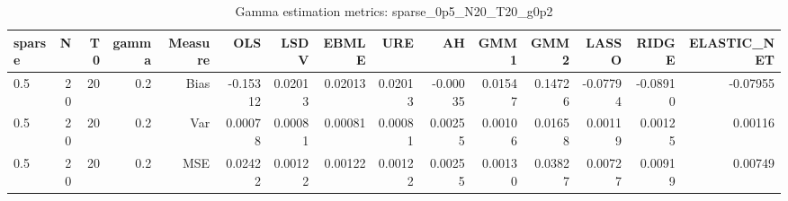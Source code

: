\begin{table}[!htbp]\centering
\caption{Gamma estimation metrics: sparse_0p5_N20_T20_g0p2}
\label{tab:table1_sparse_0p5_N20_T20_g0p2}
\begin{tabular}{lrrrrrrrrrrrrrr}
\hline
sparse & N & T0 & gamma & Measure & OLS & LSDV & EBMLE & URE & AH & GMM1 & GMM2 & LASSO & RIDGE & ELASTIC_NET \\
\hline
0.5 & 20 & 20 & 0.2 & Bias & -0.15312 & 0.02013 & 0.02013 & 0.02013 & -0.00035 & 0.01547 & 0.14726 & -0.07794 & -0.08910 & -0.07955 \\
0.5 & 20 & 20 & 0.2 & Var & 0.00078 & 0.00081 & 0.00081 & 0.00081 & 0.00255 & 0.00106 & 0.01658 & 0.00119 & 0.00125 & 0.00116 \\
0.5 & 20 & 20 & 0.2 & MSE & 0.02422 & 0.00122 & 0.00122 & 0.00122 & 0.00255 & 0.00130 & 0.03827 & 0.00727 & 0.00919 & 0.00749 \\
\hline
\end{tabular}
\end{table}

